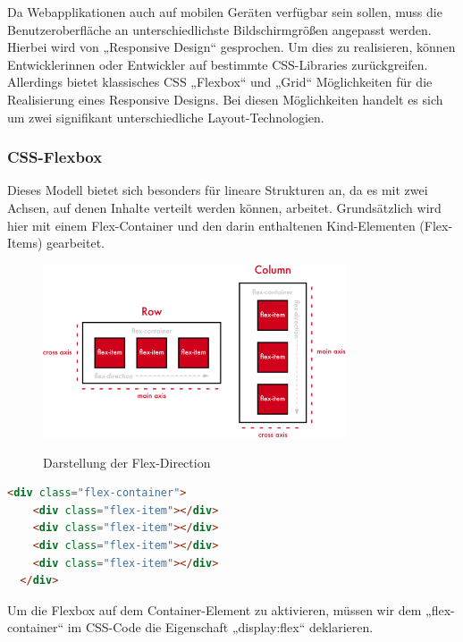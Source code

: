 Da Webapplikationen auch auf mobilen Geräten verfügbar sein sollen, muss die Benutzeroberfläche an unterschiedlichste Bildschirmgrößen angepasst werden. Hierbei wird von „Responsive Design“ gesprochen. Um dies zu realisieren, können Entwicklerinnen oder Entwickler auf bestimmte CSS-Libraries zurückgreifen. Allerdings bietet klassisches CSS „Flexbox“ und „Grid“ Möglichkeiten für die Realisierung eines Responsive Designs. Bei diesen Möglichkeiten handelt es sich um zwei signifikant unterschiedliche Layout-Technologien.

\subsubsection{CSS-Flexbox}

Dieses Modell bietet sich besonders für lineare Strukturen an, da es mit zwei Achsen, auf denen Inhalte verteilt werden können, arbeitet. Grundsätzlich wird hier mit einem Flex-Container und den darin enthaltenen Kind-Elementen (Flex-Items) gearbeitet. 
\cite{flexbox}

\begin{figure}[H]
  \centering
  \includegraphics[width=0.8\textwidth]{pics/flexDirection.png}
  \caption{Darstellung der Flex-Direction}
  \cite{flexbox2}
\end{figure}


\begin{lstlisting}[language=HTML, caption=HTML-Code vom Aufbau einer Flexbox , label=lst:impl:flexHTML]
  <div class="flex-container">
    <div class="flex-item"></div>
    <div class="flex-item"></div>
    <div class="flex-item"></div>
    <div class="flex-item"></div>
  </div>
\end{lstlisting} \cite{flexbox}

Um die Flexbox auf dem Container-Element zu aktivieren, müssen wir dem „flex-container“ im CSS-Code die Eigenschaft „display:flex“ deklarieren.
\cite{flexbox}\\


